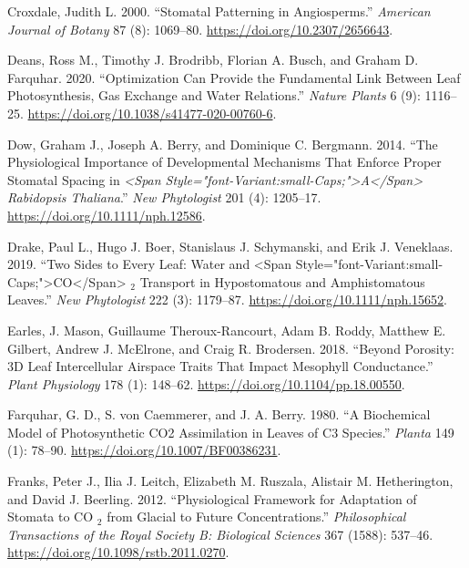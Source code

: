 \documentclass[12pt,halfline,a4paper,]{ouparticle}
\newlength{\cslhangindent}
\newlength{\cslentryspacingunit} %
\newenvironment{CSLReferences}[2] %
 {%
  \setlength{\parindent}{0pt}
  \ifodd #1
  \let\oldpar\par
  \def\par{\hangindent=\cslhangindent\oldpar}
  \fi
  \setlength{\parskip}{#2\cslentryspacingunit}
 }%
 {}
\begin{document}
\begin{CSLReferences}{1}{0}
\leavevmode{}%
Croxdale, Judith L. 2000. {``Stomatal Patterning in Angiosperms.''}
\emph{American Journal of Botany} 87 (8): 1069--80.
\url{https://doi.org/10.2307/2656643}.

\leavevmode{}%
Deans, Ross M., Timothy J. Brodribb, Florian A. Busch, and Graham D.
Farquhar. 2020. {``Optimization Can Provide the Fundamental Link Between
Leaf Photosynthesis, Gas Exchange and Water Relations.''} \emph{Nature
Plants} 6 (9): 1116--25.
\url{https://doi.org/10.1038/s41477-020-00760-6}.

\leavevmode{}%
Dow, Graham J., Joseph A. Berry, and Dominique C. Bergmann. 2014. {``The
Physiological Importance of Developmental Mechanisms That Enforce Proper
Stomatal Spacing in \emph{{\textless{}}Span
Style="font-Variant:small-Caps;"{\textgreater{}}{A}{\textless{}}/Span{\textgreater{}}
Rabidopsis Thaliana}.''} \emph{New Phytologist} 201 (4): 1205--17.
\url{https://doi.org/10.1111/nph.12586}.

\leavevmode{}%
Drake, Paul L., Hugo J. Boer, Stanislaus J. Schymanski, and Erik J.
Veneklaas. 2019. {``Two Sides to Every Leaf: Water and {\textless{}}Span
Style="font-Variant:small-Caps;"{\textgreater{}}{CO}{\textless{}}/Span{\textgreater{}}
\(_{\textrm{2}}\) Transport in Hypostomatous and Amphistomatous
Leaves.''} \emph{New Phytologist} 222 (3): 1179--87.
\url{https://doi.org/10.1111/nph.15652}.

\leavevmode{}%
Earles, J. Mason, Guillaume Theroux-Rancourt, Adam B. Roddy, Matthew E.
Gilbert, Andrew J. McElrone, and Craig R. Brodersen. 2018. {``Beyond
{Porosity}: {3D} {Leaf} {Intercellular} {Airspace} {Traits} {That}
{Impact} {Mesophyll} {Conductance}.''} \emph{Plant Physiology} 178 (1):
148--62. \url{https://doi.org/10.1104/pp.18.00550}.

\leavevmode{}%
Farquhar, G. D., S. von Caemmerer, and J. A. Berry. 1980. {``A
Biochemical Model of Photosynthetic {CO2} Assimilation in Leaves of {C3}
Species.''} \emph{Planta} 149 (1): 78--90.
\url{https://doi.org/10.1007/BF00386231}.

\leavevmode{}%
Franks, Peter J., Ilia J. Leitch, Elizabeth M. Ruszala, Alistair M.
Hetherington, and David J. Beerling. 2012. {``Physiological Framework
for Adaptation of Stomata to {CO} \(_{\textrm{2}}\) from Glacial to
Future Concentrations.''} \emph{Philosophical Transactions of the Royal
Society B: Biological Sciences} 367 (1588): 537--46.
\url{https://doi.org/10.1098/rstb.2011.0270}.


\end{CSLReferences}
\end{document}
